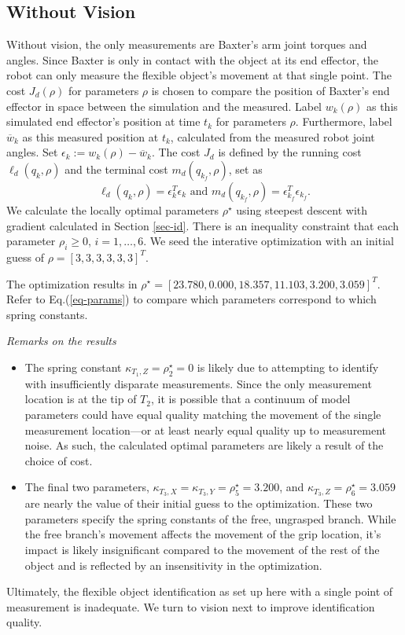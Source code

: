 \documentclass[runningheads,a4paper]{llncs}
\begin{document}
\subsection{Without Vision \label{sec-no_vis}}
Without vision, the only measurements are Baxter's arm joint torques and angles.  Since Baxter is only in contact with the object at its end effector, the robot can only measure the flexible object's movement at that single point. The cost $J_d(\rho)$ for parameters $\rho$ is chosen to compare the position of Baxter's end effector in space between the simulation and the measured.  Label $w_k(\rho)$ as this simulated end effector's position at time $t_k$ for parameters $\rho$. Furthermore, label $\overline{w}_k$ as this measured position at $t_k$, calculated from the measured robot joint angles.  Set $\epsilon_k := w_k(\rho)-\overline{w}_k$.  The cost $J_d$ is defined by the running cost $\ell_d(q_k,\rho)$ and the terminal cost $m_d(q_{k_f},\rho)$, set as
\[
\ell_d(q_k,\rho) = \epsilon_k^T\epsilon_k \textrm{ and } m_d(q_{k_f},\rho) = \epsilon_{k_f}^T\epsilon_{k_f}.
\]
We calculate the locally optimal parameters $\rho^\star$ using steepest descent with gradient calculated in Section \ref{sec-id}. There is an inequality constraint that each parameter $\rho_i\geq 0$, $i = 1,\ldots,6$. We seed the interative optimization with an initial guess of $\rho = [3, 3, 3, 3, 3, 3]^T$.  %

The optimization results in $\rho^\star = [23.780,  0.000 , 18.357 , 11.103 , 3.200,  3.059]^T$. Refer to Eq.(\ref{eq-params}) to compare which parameters correspond to which spring constants. 

\emph{Remarks on the results}
\begin{itemize}
\item The spring constant $\kappa_{T_1,Z} = \rho^\star_2 = 0$ is likely due to attempting to identify with insufficiently disparate measurements. Since the only measurement location is at the tip of $T_2$, it is possible that a continuum of model parameters could have equal quality matching the movement of the single measurement location---or at least nearly equal quality up to measurement noise. As such, the calculated optimal parameters are likely a result of the choice of cost.
\item The final two parameters, $\kappa_{T_3,X} = \kappa_{T_3,Y} = \rho^\star_5 = 3.200$, and $\kappa_{T_3,Z} = \rho^\star_6 = 3.059$ are nearly the value of their initial guess to the optimization. These two parameters specify the spring constants of the free, ungrasped branch. While the free branch's movement affects the movement of the grip location, it's impact is likely insignificant compared to the movement of the rest of the object and is reflected by an insensitivity in the optimization.
\end{itemize}
Ultimately, the flexible object identification as set up here with a single point of measurement is inadequate. We turn to vision next to improve identification quality.
\end{document}
